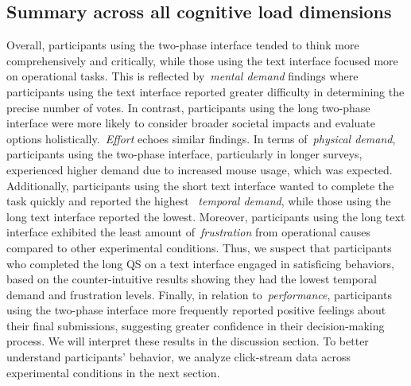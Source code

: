 \subsection{Summary across all cognitive load dimensions}
Overall, participants using the two-phase interface tended to think more comprehensively and critically, while those using the text interface focused more on operational tasks. This is reflected by~\textit{mental demand} findings where participants using the text interface reported greater difficulty in determining the precise number of votes. In contrast, participants using the long two-phase interface were more likely to consider broader societal impacts and evaluate options holistically.~\textit{Effort} echoes similar findings. In terms of~\textit{physical demand}, participants using the two-phase interface, particularly in longer surveys, experienced higher demand due to increased mouse usage, which was expected. Additionally, participants using the short text interface wanted to complete the task quickly and reported the highest ~\textit{temporal demand}, while those using the long text interface reported the lowest. Moreover, participants using the long text interface exhibited the least amount of~\textit{frustration} from operational causes compared to other experimental conditions. Thus, we suspect that participants who completed the long QS on a text interface engaged in satisficing behaviors, based on the counter-intuitive results showing they had the lowest temporal demand and frustration levels. Finally, in relation to~\textit{performance}, participants using the two-phase interface more frequently reported positive feelings about their final submissions, suggesting greater confidence in their decision-making process. We will interpret these results in the discussion section. To better understand participants' behavior, we analyze click-stream data across experimental conditions in the next section.

